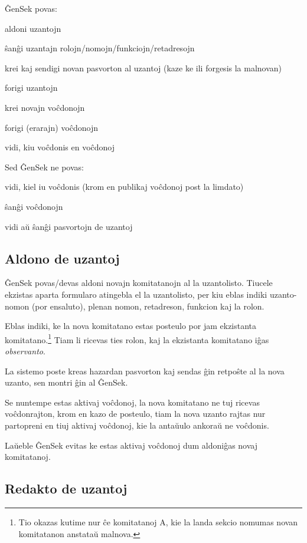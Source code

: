 \documentclass[draft]{scrartcl}
\newenvironment{itemize*}{%
  \begin{itemize}%
  \setlength{\itemsep}{0pt}%
  \setlength{\parsep}{0pt}%
  \setlength{\parskip}{2pt plus 1pt}
  \setlength{\topsep}{1pt}%
}{%
    \end{itemize}%
}
\begin{document}
ĜenSek povas:
\begin{itemize*}
\item aldoni uzantojn
\item ŝanĝi uzantajn rolojn/nomojn/funkciojn/retadresojn
\item krei kaj sendigi novan pasvorton al uzantoj (kaze ke ili
  forgesis la malnovan)
\item forigi uzantojn
\item krei novajn voĉdonojn
\item forigi (erarajn) voĉdonojn
\item vidi, kiu voĉdonis en voĉdonoj
\end{itemize*}

Sed ĜenSek ne povas:
\begin{itemize*}
\item vidi, kiel iu voĉdonis (krom en publikaj voĉdonoj post la limdato)
\item ŝanĝi voĉdonojn
\item vidi aŭ ŝanĝi pasvortojn de uzantoj
\end{itemize*}

\subsection{Aldono de uzantoj}

ĜenSek povas/devas aldoni novajn komitatanojn al la uzantolisto.
Tiucele ekzistas aparta formularo atingebla el la uzantolisto, per kiu
eblas indiki uzanto-nomon (por ensaluto), plenan nomon, retadreson,
funkcion kaj la rolon.

Eblas indiki, ke la nova komitatano estas posteulo por jam ekzistanta
komitatano.\footnote{Tio okazas kutime nur ĉe komitatanoj A, kie la landa
  sekcio nomumas novan komitatanon anstataŭ malnova.} Tiam li ricevas
ties rolon, kaj la ekzistanta komitatano iĝas \emph{observanto}.

La sistemo poste kreas hazardan pasvorton kaj sendas ĝin retpoŝte al
la nova uzanto, sen montri ĝin al ĜenSek.

Se nuntempe estas aktivaj voĉdonoj, la nova komitatano ne tuj ricevas
voĉdonrajton, krom en kazo de posteulo, tiam la nova uzanto rajtas nur
partopreni en tiuj aktivaj voĉdonoj, kie la antaŭulo ankoraŭ ne voĉdonis.

Laŭeble ĜenSek evitas ke estas aktivaj voĉdonoj dum aldoniĝas novaj
komitatanoj.



\subsection{Redakto de uzantoj}
\end{document}
